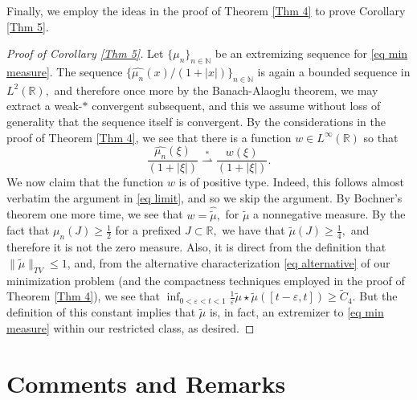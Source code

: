 \documentclass[11pt, reqno]{amsart}
\newcommand{\s}{\star}
\numberwithin{equation}{section}
\newcommand{\R}{{\mathbb R}}
\newcommand{\N}{{\mathbb N}}
\newcommand{\eps}{{\varepsilon}}
\begin{document}
Finally, we employ the ideas in the proof of Theorem \ref{Thm 4} to prove Corollary \ref{Thm 5}.

\begin{proof}[Proof of Corollary \ref{Thm 5}] Let $\{\mu_n\}_{n \in \N}$ be an extremizing sequence for \eqref{eq min measure}.
The sequence $\{\widehat{\mu_n}(x)/(1+|x|)\}_{n \in \N}$ is again a bounded sequence in $L^2(\R),$ and therefore once more by the Banach-Alaoglu theorem, we may 
extract a weak-$*$ convergent subsequent, and this we assume without loss of generality that the sequence itself is convergent. By the considerations in the proof of Theorem \ref{Thm 4}, we see that there
is a function $w \in L^{\infty}(\R)$ so that 
\[
\frac{\widehat{\mu_n}(\xi)}{(1+|\xi|)} \overset{\ast}{\rightharpoonup} \frac{w(\xi)}{(1+|\xi|)}.
\]
We now claim that the function $w$ is of positive type. Indeed, this follows almost verbatim the argument in \eqref{eq limit}, and so we skip the argument. By Bochner's theorem one more time, 
we see that $w = \widehat{\tilde{\mu}},$ for $\tilde{\mu}$ a nonnegative measure. By the fact that $\mu_n(J) \ge \frac{1}{2}$ for a prefixed $J \subset \R,$ we have that $\tilde{\mu}(J) \ge \frac{1}{4},$ and therefore 
it is not the zero measure. Also, it is direct from the definition that $\|\tilde{\mu}\|_{TV} \le 1$, and, from the alternative characterization \eqref{eq alternative} of our minimization problem (and the compactness techniques employed in the proof of Theorem \ref{Thm 4}), 
we see that $\inf_{0 < \eps < t < 1} \frac{1}{\eps} \tilde{\mu} \s \tilde{\mu}([t-\eps,t]) \ge \tilde{C}_4.$ But the definition of this constant implies that 
$\tilde{\mu}$ is, in fact, an extremizer to \eqref{eq min measure} within our restricted class, as desired.
\end{proof}


\section{Comments and Remarks} 
\end{document}
